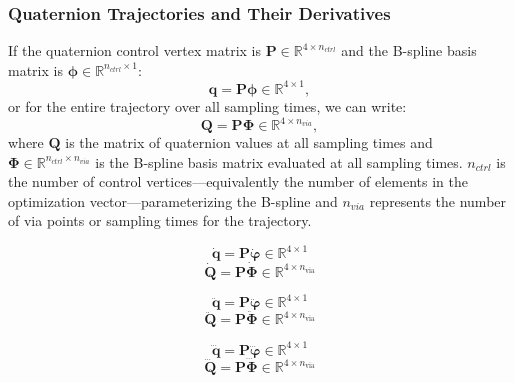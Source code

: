 \subsubsection{Quaternion Trajectories and Their Derivatives}
If the quaternion control vertex matrix is $\mathbf{P} \in \mathbb{R}^{4 \times n_{ctrl}}$ and the B-spline basis matrix is $\boldsymbol{\phi} \in \mathbb{R}^{n_{ctrl} \times 1}$:
\begin{equation}
\mathbf{q} = \mathbf{P} \boldsymbol{\phi} \in \mathbb{R}^{4 \times 1},
\label{eq:quat_vec_bspline}
\end{equation}
or for the entire trajectory over all sampling times, we can write:
\begin{equation}
\mathbf{Q} = \mathbf{P} \mathbf{\Phi} \in \mathbb{R}^{4 \times n_{via}},
\label{eq:quat_mat_bspline}
\end{equation}
where $\mathbf{Q}$ is the matrix of quaternion values at all sampling times and $\mathbf{\Phi} \in \mathbb{R}^{n_{ctrl} \times n_{via}}$ is the B-spline basis matrix evaluated at all sampling times.
$n_{ctrl}$ is the number of control vertices---equivalently the number of elements in the optimization vector---parameterizing the B-spline and $n_{via}$ represents the number of via points or sampling times for the trajectory.

\begin{equation}
    \dot{\mathbf{q}} = 
    \mathbf{P}\dot{\boldsymbol{\varphi}} \in \mathbb{R}^{4 \times 1}
\label{eq_quatd_vec_bspline}
\end{equation}
\begin{equation}
    \dot{\mathbf{Q}} = 
    \mathbf{P}\dot{\boldsymbol{\Phi}} \in \mathbb{R}^{4 \times n_{\text{via}}}
\label{eq_quatd_mat_bspline}
\end{equation}

\begin{equation}
    \ddot{\mathbf{q}} = 
    \mathbf{P}\ddot{\boldsymbol{\varphi}} \in \mathbb{R}^{4 \times 1}
\label{eq_quatdd_vec_bspline}
\end{equation}
\begin{equation}
    \ddot{\mathbf{Q}} = 
    \mathbf{P}\ddot{\boldsymbol{\Phi}} \in \mathbb{R}^{4 \times n_{\text{via}}}
\label{eq_quatdd_mat_bspline}
\end{equation}

\begin{equation}
    \dddot{\mathbf{q}} = 
    \mathbf{P}\dddot{\boldsymbol{\varphi}} \in \mathbb{R}^{4 \times 1}
\label{eq_quatddd_vec_bspline}
\end{equation}
\begin{equation}
    \dddot{\mathbf{Q}} = 
    \mathbf{P}\dddot{\boldsymbol{\Phi}} \in \mathbb{R}^{4 \times n_{\text{via}}}
\label{eq_quatddd_mat_bspline}
\end{equation}


